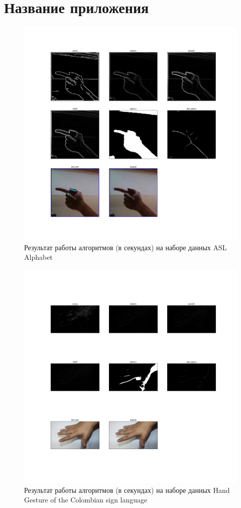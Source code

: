 \section{Название приложения}
\label{sec:Appendix_}

\begin{figure}[!h]
	\centering
	\includegraphics[width=\textwidth,keepaspectratio]{figures/ru/asl}
	\caption{Результат работы алгоритмов (в секундах) на наборе данных ASL Alphabet}
	\label{fig:asl}
\end{figure}

\begin{figure}[!h]
	\centering
	\includegraphics[width=\textwidth,keepaspectratio]{figures/ru/coombian}
	\caption{Результат работы алгоритмов (в секундах) на наборе данных Hand Gesture of the Colombian sign language}
	\label{fig:colombian}
\end{figure}

